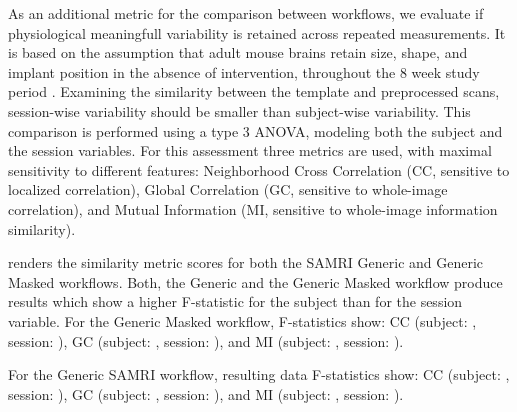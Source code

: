 \begin{sansmath}
\end{sansmath}

As an additional metric for the comparison between workflows, we evaluate if physiological meaningfull variability is retained across repeated measurements.
It is based on the assumption that adult mouse brains retain size, shape, and implant position in the absence of intervention, throughout the 8 week study period \cite{ioanas_optimized_2019}.
Examining the similarity between the template and preprocessed scans, session-wise variability should be smaller than subject-wise variability.
This comparison is performed using a type 3 ANOVA, modeling both the subject and the session variables.
For this assessment three metrics are used, with maximal sensitivity to different features:
Neighborhood Cross Correlation (CC, sensitive to localized correlation),
Global Correlation (GC, sensitive to whole-image correlation),
and Mutual Information (MI, sensitive to whole-image information similarity).

 renders the similarity metric scores for both the SAMRI Generic and Generic Masked workflows.
Both, the Generic and the Generic Masked workflow produce results which show a higher F-statistic for the subject than for the session variable.
For the Generic Masked workflow, F-statistics show:
CC (subject: , session: ),
GC (subject: , session: ),
and MI (subject: , session: ).

For the Generic SAMRI workflow, resulting data F-statistics show:
CC (subject: , session: ),
GC (subject: , session: ),
and MI (subject: , session: ).

